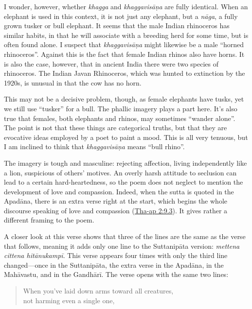 \documentclass[12pt,openany]{book}%
\begin{document}
I wonder, however, whether \textit{khagga} and \textit{\textsanskrit{khaggavisāṇa}} are fully identical. When an elephant is used in this context, it is not just any elephant, but a \textit{\textsanskrit{nāga}}, a fully grown tusker or bull elephant. It seems that the male Indian rhinoceros has similar habits, in that he will associate with a breeding herd for some time, but is often found alone. I suspect that \textit{\textsanskrit{khaggavisāṇa}} might likewise be a male “horned rhinoceros”. Against this is the fact that female Indian rhinos also have horns. It is also the case, however, that in ancient India there were two species of rhinoceros. The Indian Javan Rhinoceros, which was hunted to extinction by the 1920s, is unusual in that the cow has no horn.

This may not be a decisive problem, though, as female elephants have tusks, yet we still use “tusker” for a bull. The phallic imagery plays a part here. It’s also true that females, both elephants and rhinos, may sometimes “wander alone”. The point is not that these things are categorical truths, but that they are evocative ideas employed by a poet to paint a mood. This is all very tenuous, but I am inclined to think that \textit{\textsanskrit{khaggavisāṇa}} means “bull rhino”.

The imagery is tough and masculine: rejecting affection, living independently like a lion, suspicious of others’ motives. An overly harsh attitude to seclusion can lead to a certain hard-heartedness, so the poem does not neglect to mention the development of love and compassion. Indeed, when the sutta is quoted in the \textsanskrit{Apadāna}, there is an extra verse right at the start, which begins the whole discourse speaking of love and compassion (\href{https://suttacentral.net/tha-ap2}{Tha{-}ap 2:9.3}). It gives rather a different framing to the poem.

A closer look at this verse shows that three of the lines are the same as the verse that follows, meaning it adds only one line to the \textsanskrit{Suttanipāta} version: \textit{mettena cittena \textsanskrit{hitānukampī}}. This verse appears four times with only the third line changed—once in the \textsanskrit{Suttanipāta}, the extra verse in the \textsanskrit{Apadāna}, in the \textsanskrit{Mahāvastu}, and in the \textsanskrit{Gandhārī}. The verse opens with the same two lines:

\begin{verse}%
When you’ve laid down arms toward all creatures, \\
not harming even a single one,

%
\end{verse}
\end{document}
